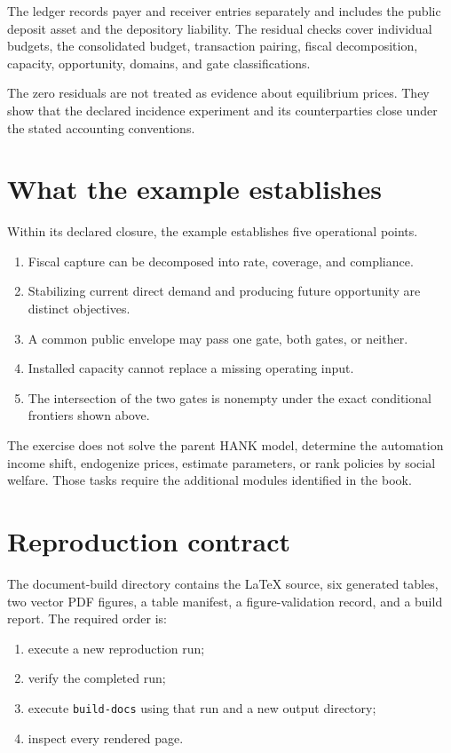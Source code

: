 \documentclass[11pt]{article}
\begin{document}
The ledger records payer and receiver entries separately and includes the public
deposit asset and the depository liability. The residual checks cover individual
budgets, the consolidated budget, transaction pairing, fiscal decomposition,
capacity, opportunity, domains, and gate classifications.

\begin{table}[H]
\centering
\caption{Calculated accounting and domain checks}

\end{table}

The zero residuals are not treated as evidence about equilibrium prices. They
show that the declared incidence experiment and its counterparties close under
the stated accounting conventions.

\clearpage
\section{What the example establishes}

Within its declared closure, the example establishes five operational points.
\begin{enumerate}
\item Fiscal capture can be decomposed into rate, coverage, and compliance.
\item Stabilizing current direct demand and producing future opportunity are
distinct objectives.
\item A common public envelope may pass one gate, both gates, or neither.
\item Installed capacity cannot replace a missing operating input.
\item The intersection of the two gates is nonempty under the exact conditional
frontiers shown above.
\end{enumerate}

The exercise does not solve the parent HANK model, determine the automation
income shift, endogenize prices, estimate parameters, or rank policies by social
welfare. Those tasks require the additional modules identified in the book.

\section{Reproduction contract}

The document-build directory contains the LaTeX source, six generated
tables, two vector PDF figures, a table manifest, a figure-validation record, and
a build report. The required order is:
\begin{enumerate}
\item execute a new reproduction run;
\item verify the completed run;
\item execute \texttt{build-docs} using that run and a new output directory;
\item inspect every rendered page.
\end{enumerate}
\end{document}
